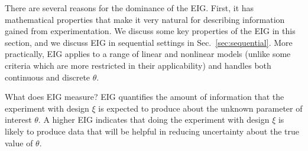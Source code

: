 \documentclass[a4paper, 10pt]{report}
\theoremstyle{plain}
\begin{document}
	There are several reasons for the dominance of the EIG. First, it has mathematical properties that make it very natural for describing information gained from experimentation. We discuss some key properties of the EIG in this section, and we discuss EIG in sequential settings in Sec.~\ref{sec:sequential}. More practically, EIG applies to a range of linear and nonlinear models (unlike some criteria which are more restricted in their applicability) and handles both continuous and discrete $\theta$.
	
	What does EIG measure? EIG quantifies the amount of  information that the experiment with design $\xi$ is expected to produce about the unknown parameter of interest $\theta$.
	A higher EIG indicates that doing the experiment with design $\xi$ is likely to produce data that will be helpful in reducing uncertainty about the true value of $\theta$.
	
\end{document}
